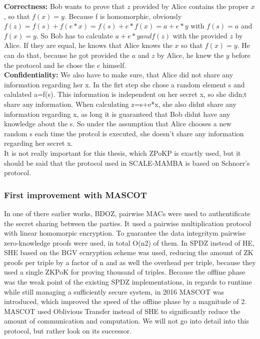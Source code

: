\documentclass[english,runningheads,a4paper]{llncs}[2018/03/10]
\begin{document}
\textbf{Correctness:}
Bob wants to prove that \( z\) provided by Alice contains the proper \( x\), so that \( f(x)=y\). 
Because f is homomorphic, obviously \( f(z)=f(s)+f(e*x)=f(s)+e*f(x)=a+e*y\) with \(f(s)=a\) and \(f(x)=y\).
So Bob has to calculate \( a+e*y and f(z)\) with the provided \( z\) by Alice. If they are equal, he knows that Alice knows the \( x\) so that \( f(x)=y\).
He can do that, because he got provided the \( a\) and \( z\) by Alice, he knew the \( y\) before the protocol and he chose the \( e\) himself.\\

\textbf{Confidentiality:}
We also have to make sure, that Alice did not share any information regarding her x.
In the firt step she chose a random element s and calulated a=f(s). This information is independent on her secret x, so she didn;t share any information.
When calculating z=s+e*x, she also didnt share any information regarding x, as long it is guaranteed that Bob didnt have any knowledge about the s.
So under the assumption that Alice chooses a new random s each time the protcol is executed, she doesn't share any information regarding her secret x.\\

It is not really important for this thesis, which ZPoKP is exactly used, but it should be said that the protocol used in SCALE-MAMBA is based on Schnorr's protocol.\\

\subsubsection{First improvement with MASCOT}
In one of there earlier works, BDOZ, pairwise MACs were used to authentificate the secret sharing between the parties. It used a pairwise multiplication protocol with linear homomorpic encryption. To guarantee the data integritym pairwise zero-knowledge proofs were used, in total O(n2) of them. 
In SPDZ instead of HE, SHE based on the BGV ecnryption scheme was used, reducing the amount of ZK proofs per triple by a factor of n and as well the overhead per triple, because they used a single ZKPoK for proving thousand of triples.
Because the offline phase was the weak point of the existing SPDZ implementations, in regards to runtime while still managing a sufficiently secure system, in 2016 MASCOT \cite{cryptoeprint:2016:505} was introduced, which improved the speed of the offline phase by a magnitude of 2. MASCOT used Oblivious Transfer instead of SHE to significantly reduce the amount of communication and computation. We will not go into detail into this protocol, but rather look on its successor.
\end{document}
